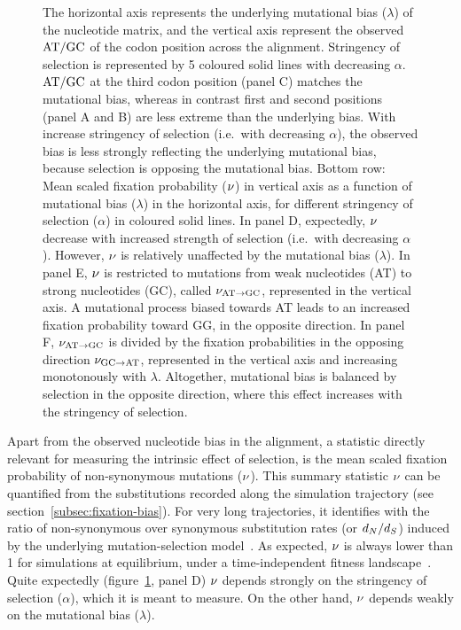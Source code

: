 \documentclass{article}
\begin{document}
\begin{figure}[h]
{        The horizontal axis represents the underlying mutational bias ($\lambda$) of the nucleotide matrix, and the vertical axis represent the observed $\text{AT/GC}$ of the codon position across the alignment.
        Stringency of selection is represented by 5 coloured solid lines with decreasing $\alpha$.
        $\text{AT/GC}$ at the third codon position (panel C) matches the mutational bias, whereas in contrast first and second positions (panel A and B) are less extreme than the underlying bias.
        With increase stringency of selection (i.e.~with decreasing $\alpha$), the observed bias is less strongly reflecting the underlying mutational bias, because selection is opposing the mutational bias.
        Bottom row: Mean scaled fixation probability ($\nu$) in vertical axis as a function of mutational bias ($\lambda$) in the horizontal axis, for different stringency of selection ($\alpha$) in coloured solid lines.
        In panel D, expectedly, $\nu$ decrease with increased strength of selection (i.e.~with decreasing $\alpha$).
        However, $\nu$ is relatively unaffected by the mutational bias ($\lambda$).
        In panel E, $\nu$ is restricted to mutations from weak nucleotides (AT) to strong nucleotides (GC), called $\nu_{\text{AT} \rightarrow \text{GC}}$, represented in the vertical axis.
        A mutational process biased towards AT leads to an increased fixation probability toward GG, in the opposite direction.
        In panel F, $\nu_{\text{AT} \rightarrow \text{GC}}$ is divided by the fixation probabilities in the opposing direction $\nu_{\text{GC} \rightarrow \text{AT}}$, represented in the vertical axis and increasing monotonously with $\lambda$.
        Altogether, mutational bias is balanced by selection in the opposite direction, where this effect increases with the stringency of selection.
    }
    \label{fig:simu-mut-bias}
\end{figure}

Apart from the observed nucleotide bias in the alignment, a statistic directly relevant for measuring the intrinsic effect of selection, is the mean scaled fixation probability of {non-synonymous} mutations ($\nu$).
This summary statistic $\nu$ can be quantified from the {substitutions} recorded along the simulation trajectory (see section~\ref{subsec:fixation-bias}).
For very long trajectories, it identifies with the ratio of {non-synonymous} over {synonymous} {substitution} rates (or $d_N / d_S$) induced by the underlying mutation-selection model~\citep{Spielman2015, DosReis2015, Jones2016}.
As expected, $\nu$ is always lower than 1 for simulations at equilibrium, under a time-independent fitness landscape~\citep{Spielman2015}.
Quite expectedly (figure~\ref{fig:simu-mut-bias}, panel D) $\nu$ depends strongly on the stringency of selection ($\alpha$), which it is meant to measure.
On the other hand, $\nu$ depends weakly on the mutational bias ($\lambda$).
\end{document}
